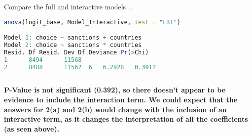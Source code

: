 \documentclass[12pt,letterpaper]{article}
\begin{document}
\noindent Compare the full and interactive models ...

\begin{lstlisting}[language=R]
anova(logit_base, Model_Interactive, test = "LRT")

Model 1: choice ~ sanctions + countries
Model 2: choice ~ sanctions * countries
Resid. Df Resid. Dev Df Deviance Pr(>Chi)
1      8494      11568                     
2      8488      11562  6   6.2928   0.3912
	
\end{lstlisting}

\noindent \textbf{P-Value is not significant (0.392), so there doesn't appear to be evidence to include the interaction term. We could expect that the answers for 2(a) and 2(b) would change with the inclusion of an interactive term, as it changes the interpretation of all the coefficients (as seen above).}
\end{document}
